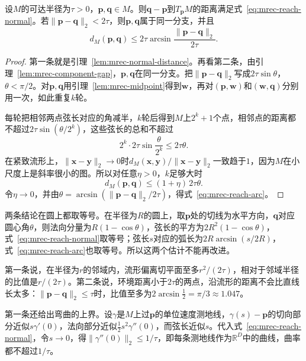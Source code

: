 \begin{theorem}[可达半径的局部推论]
\label{thm:mrec-reach-consequences}
设$M$的可达半径为$\tau>0$，$\bm p,\bm q\in M$。则$\bm q-\bm p$到$T_{\bm p}M$的距离满足式~\eqref{eq:mrec-reach-normal}。若$\lVert\bm p-\bm q\rVert_2<2\tau$，则$\bm p,\bm q$属于同一分支，并且
\begin{equation}
 d_M(\bm p,\bm q)\leq2\tau\arcsin\frac{\lVert\bm p-\bm q\rVert_2}{2\tau}.
 \label{eq:mrec-reach-arc}
\end{equation}
\end{theorem}

\begin{proof}
第一条就是引理~\ref{lem:mrec-normal-distance}。再看第二条，由引理~\ref{lem:mrec-component-gap}，$\bm p,\bm q$在同一分支。把$\lVert\bm p-\bm q\rVert_2$写成$2\tau\sin\theta$，$\theta<\pi/2$。对$\bm p,\bm q$用引理~\ref{lem:mrec-midpoint}得到$\bm w$，再对$(\bm p,\bm w)$和$(\bm w,\bm q)$分别用一次，如此重复$k$轮。

每轮把相邻两点弦长对应的角减半，$k$轮后得到$M$上$2^k+1$个点，相邻点的距离都不超过$2\tau\sin(\theta/2^k)$，这些弦长的总和不超过
\[
 2^k\cdot2\tau\sin\frac\theta{2^k}\leq2\tau\theta .
\]
在紧致流形上，$\lVert\bm x-\bm y\rVert_2\to0$时$d_M(\bm x,\bm y)/\lVert\bm x-\bm y\rVert_2$一致趋于$1$，因为$M$在小尺度上是斜率很小的图。所以对任意$\eta>0$，$k$足够大时
\[
 d_M(\bm p,\bm q)\leq(1+\eta)\,2\tau\theta .
\]
令$\eta\to0$，并由$\theta=\arcsin(\lVert\bm p-\bm q\rVert_2/2\tau)$，得式~\eqref{eq:mrec-reach-arc}。
\end{proof}

两条结论在圆上都取等号。在半径为$R$的圆上，取$\bm p$处的切线为水平方向，$\bm q$对应圆心角$\theta$，则法向分量为$R(1-\cos\theta)$，弦长的平方为$2R^2(1-\cos\theta)$，式~\eqref{eq:mrec-reach-normal}取等号；弦长$s$对应的弧长为$2R\arcsin(s/2R)$，式~\eqref{eq:mrec-reach-arc}也取等号。所以这两个估计不能再改进。

第一条说，在半径为$r$的邻域内，流形偏离切平面至多$r^2/(2\tau)$，相对于邻域半径的比值是$r/(2\tau)$。第二条说，环境距离小于$2\tau$的两点，沿流形的距离不会比直线长太多：$\lVert\bm p-\bm q\rVert_2\leq\tau$时，比值至多为$2\arcsin\tfrac12=\pi/3\approx1.047$。

第一条还给出弯曲的上界。设$\gamma$是$M$上过$\bm p$的单位速度测地线，$\gamma(s)-\bm p$的切向部分近似$s\gamma'(0)$，法向部分近似$\tfrac12s^2\gamma''(0)$，而弦长近似$s$。代入式~\eqref{eq:mrec-reach-normal}，令$s\to0$，得$\lVert\gamma''(0)\rVert_2\leq1/\tau$，即每条测地线作为$\mathbb R^D$中的曲线，曲率都不超过$1/\tau$。

